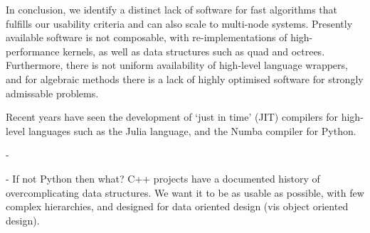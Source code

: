 In conclusion, we identify a distinct lack of software for fast algorithms that fulfills our usability criteria and can also scale to multi-node systems. Presently available software is not composable, with re-implementations of high-performance kernels, as well as data structures such as quad and octrees. Furthermore, there is not uniform availability of high-level language wrappers, and for algebraic methods there is a lack of highly optimised software for strongly admissable problems.

Recent years have seen the development of `just in time' (JIT) compilers for high-level languages such as the Julia language, and the Numba compiler for Python.

- 

- If not Python then what? C++ projects have a documented history of overcomplicating data structures. We want it to be as usable as possible, with few complex hierarchies, and designed for data oriented design (vis object oriented design).
